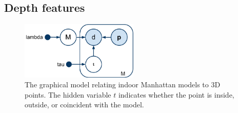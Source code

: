 \documentclass{article}
\begin{document}
\subsection{Depth features}


\begin{figure}[tb]
  \centering
  \includegraphics[width=0.5\textwidth]{figures/3d-gm}
  \caption{The graphical model relating indoor Manhattan models to 3D
    points. The hidden variable $t$ indicates whether the point is
    inside, outside, or coincident with the model.}
  \label{fig:monocular-gm}
\end{figure}
\end{document}
